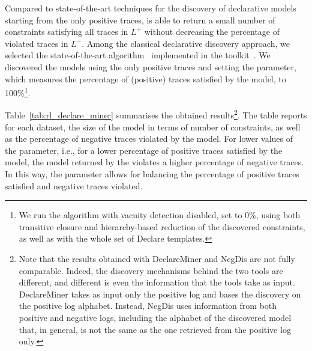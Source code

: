 
Compared to state-of-the-art techniques for the discovery of declarative models starting from the only positive traces, \nd is able to return a small number of constraints satisfying all traces in $L^+$ without decreasing the percentage of violated traces in $L^-$.  
Among the classical declarative discovery approach, we selected the state-of-the-art \declareminer algorithm~\cite{2018a-Maggi} implemented in the \rum toolkit~\cite{2020-Alman}. We discovered the models using the only positive traces and setting the  parameter, which measures the percentage of (positive) traces satisfied by the \declare model, to 100\%\footnote{We run the \declareminer algorithm with vacuity detection disabled,  set to 0\%, using both transitive closure and hierarchy-based reduction of the discovered constraints, as well as with the whole set of Declare templates.}.

Table~\ref{tab:rl_declare_miner} summarises the obtained results\footnote{Note that the results obtained with DeclareMiner and NegDis are not fully comparable. Indeed, the discovery mechanisms behind the two tools are different, and different is even the information that the tools take as input. DeclareMiner takes as input only the positive log and bases the discovery on the positive log alphabet. Instead, NegDis uses information from both positive and negative logs, including the alphabet of the discovered model that, in general, is not the same as the one retrieved from the positive log only.
}. The table reports for each dataset, the size of the model in terms of number of constraints, as well as the percentage of negative traces violated by the model. For lower values of the  parameter, i.e., for a lower percentage of positive traces satisfied by the model, the model returned by the \declareminer violates a higher percentage of negative traces. In this way, the  parameter allows for balancing the percentage of positive traces satisfied and negative traces violated. 

